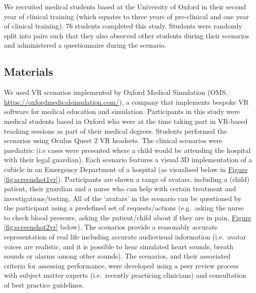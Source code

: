 \documentclass[a4paper, nobind]{templates/ociamthesis}
\begin{document}
We recruited medical students based at the University of Oxford in their second year of clinical training (which equates to three years of pre-clinical and one year of clinical training). 76 students completed this study. Students were randomly split into pairs such that they also observed other students during their scenarios and administered a questionnaire during the scenario.

\subsection{Materials}\label{materials-2}

We used VR scenarios implemented by Oxford Medical Simulation (OMS, \url{https://oxfordmedicalsimulation.com/}), a company that implements bespoke VR software for medical education and simulation. Participants in this study were medical students based in Oxford who were at the time taking part in VR-based teaching sessions as part of their medical degrees. Students performed the scenarios using Oculus Quest 2 VR headsets. The clinical scenarios were paediatric (i.e cases were presented where a child would be attending the hospital with their legal guardian). Each scenario features a visual 3D implementation of a cubicle in an Emergency Department of a hospital (as visualised below in \hyperref[fig:screenshot1vr]{Figure \ref{fig:screenshot1vr}}). Participants are shown a range of avatars, including a (child) patient, their guardian and a nurse who can help with certain treatment and investigations/testing. All of the `avatars' in the scenario can be questioned by the participant using a predefined set of requests/actions (e.g.~asking the nurse to check blood pressure, asking the patient/child about if they are in pain, \hyperref[fig:screenshot2vr]{Figure \ref{fig:screenshot2vr}} below). The scenarios provide a reasonably accurate representation of real life including accurate audiovisual information (i.e.~avatar voices are realistic, and it is possible to hear simulated heart sounds, breath sounds or alarms among other sounds). The scenarios, and their associated criteria for assessing performance, were developed using a peer review process with subject matter experts (i.e.~recently practicing clinicians) and consultation of best practice guidelines.

\newpage
\end{document}

